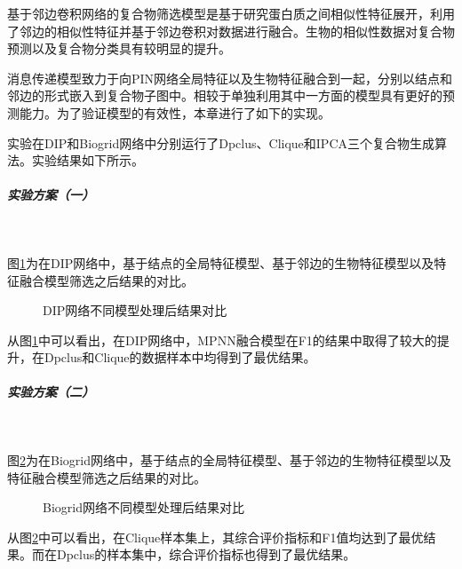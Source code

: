 基于邻边卷积网络的复合物筛选模型是基于研究蛋白质之间相似性特征展开，利用了邻边的相似性特征并基于邻边卷积对数据进行融合。生物的相似性数据对复合物预测以及复合物分类具有较明显的提升。

消息传递模型致力于向PIN网络全局特征以及生物特征融合到一起，分别以结点和邻边的形式嵌入到复合物子图中。相较于单独利用其中一方面的模型具有更好的预测能力。为了验证模型的有效性，本章进行了如下的实现。

实验在DIP和Biogrid网络中分别运行了Dpclus、Clique和IPCA三个复合物生成算法。实验结果如下所示。

\subparagraph*{实验方案（一）} ~

图\ref{fig:result/DIP/fusion}为在DIP网络中，基于结点的全局特征模型、基于邻边的生物特征模型以及特征融合模型筛选之后结果的对比。
\begin{figure}[htbp]
    \centering
    \vskip0.2cm
    \caption{DIP网络不同模型处理后结果对比}
    \label{fig:result/DIP/fusion}
\end{figure}

从图\ref{fig:result/DIP/fusion}中可以看出，在DIP网络中，MPNN融合模型在F1的结果中取得了较大的提升，在Dpclus和Clique的数据样本中均得到了最优结果。

\subparagraph*{实验方案（二）} ~

图\ref{fig:result/Biogrid/fusion}为在Biogrid网络中，基于结点的全局特征模型、基于邻边的生物特征模型以及特征融合模型筛选之后结果的对比。
\begin{figure}[htbp]
    \centering
    \vskip0.2cm
    \caption{Biogrid网络不同模型处理后结果对比}
    \label{fig:result/Biogrid/fusion}
\end{figure}
从图\ref{fig:result/Biogrid/fusion}中可以看出，在Clique样本集上，其综合评价指标和F1值均达到了最优结果。而在Dpclus的样本集中，综合评价指标也得到了最优结果。

